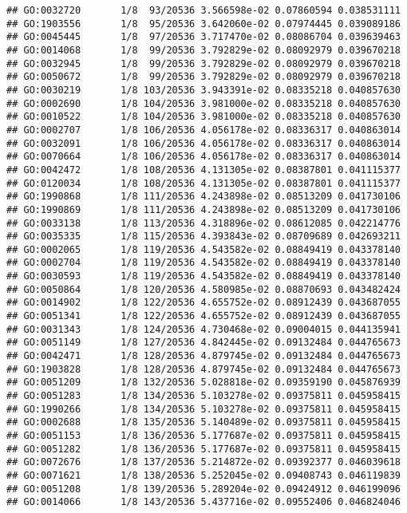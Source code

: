 \documentclass[
]{article}
\begin{document}
\begin{verbatim}
## GO:0032720       1/8  93/20536 3.566598e-02 0.07860594 0.038531111
## GO:1903556       1/8  95/20536 3.642060e-02 0.07974445 0.039089186
## GO:0045445       1/8  97/20536 3.717470e-02 0.08086704 0.039639463
## GO:0014068       1/8  99/20536 3.792829e-02 0.08092979 0.039670218
## GO:0032945       1/8  99/20536 3.792829e-02 0.08092979 0.039670218
## GO:0050672       1/8  99/20536 3.792829e-02 0.08092979 0.039670218
## GO:0030219       1/8 103/20536 3.943391e-02 0.08335218 0.040857630
## GO:0002690       1/8 104/20536 3.981000e-02 0.08335218 0.040857630
## GO:0010522       1/8 104/20536 3.981000e-02 0.08335218 0.040857630
## GO:0002707       1/8 106/20536 4.056178e-02 0.08336317 0.040863014
## GO:0032091       1/8 106/20536 4.056178e-02 0.08336317 0.040863014
## GO:0070664       1/8 106/20536 4.056178e-02 0.08336317 0.040863014
## GO:0042472       1/8 108/20536 4.131305e-02 0.08387801 0.041115377
## GO:0120034       1/8 108/20536 4.131305e-02 0.08387801 0.041115377
## GO:1990868       1/8 111/20536 4.243898e-02 0.08513209 0.041730106
## GO:1990869       1/8 111/20536 4.243898e-02 0.08513209 0.041730106
## GO:0033138       1/8 113/20536 4.318896e-02 0.08612085 0.042214776
## GO:0035335       1/8 115/20536 4.393843e-02 0.08709689 0.042693211
## GO:0002065       1/8 119/20536 4.543582e-02 0.08849419 0.043378140
## GO:0002704       1/8 119/20536 4.543582e-02 0.08849419 0.043378140
## GO:0030593       1/8 119/20536 4.543582e-02 0.08849419 0.043378140
## GO:0050864       1/8 120/20536 4.580985e-02 0.08870693 0.043482424
## GO:0014902       1/8 122/20536 4.655752e-02 0.08912439 0.043687055
## GO:0051341       1/8 122/20536 4.655752e-02 0.08912439 0.043687055
## GO:0031343       1/8 124/20536 4.730468e-02 0.09004015 0.044135941
## GO:0051149       1/8 127/20536 4.842445e-02 0.09132484 0.044765673
## GO:0042471       1/8 128/20536 4.879745e-02 0.09132484 0.044765673
## GO:1903828       1/8 128/20536 4.879745e-02 0.09132484 0.044765673
## GO:0051209       1/8 132/20536 5.028818e-02 0.09359190 0.045876939
## GO:0051283       1/8 134/20536 5.103278e-02 0.09375811 0.045958415
## GO:1990266       1/8 134/20536 5.103278e-02 0.09375811 0.045958415
## GO:0002688       1/8 135/20536 5.140489e-02 0.09375811 0.045958415
## GO:0051153       1/8 136/20536 5.177687e-02 0.09375811 0.045958415
## GO:0051282       1/8 136/20536 5.177687e-02 0.09375811 0.045958415
## GO:0072676       1/8 137/20536 5.214872e-02 0.09392377 0.046039618
## GO:0071621       1/8 138/20536 5.252045e-02 0.09408743 0.046119839
## GO:0051208       1/8 139/20536 5.289204e-02 0.09424912 0.046199096
## GO:0014066       1/8 143/20536 5.437716e-02 0.09552406 0.046824046

\end{verbatim}
\end{document}
